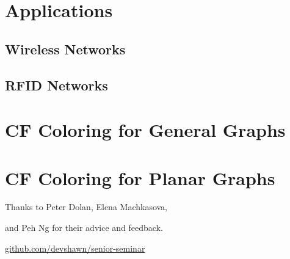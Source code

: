 \documentclass[xcolor=dvipsnames,aspectratio=1610]{beamer}
\newcommand{\examplewidth}{16cm}
\begin{document}
\begin{frame}

  \end{frame}


  \section{Applications}

  \subsection{Wireless Networks}

  \subsection{RFID Networks}



  \section{CF Coloring for General Graphs}

  \section{CF Coloring for Planar Graphs}

  \begin{frame}[standout]
    \centering
    {Thanks to Peter Dolan, Elena Machkasova,

    and Peh Ng for their advice and feedback.}
    \vfill
    \href{https://github.com/devshawn/senior-seminar}{github.com/devshawn/senior-seminar}
    \vfill
    \ccbyncsa{}
  \end{frame}
\end{document}
